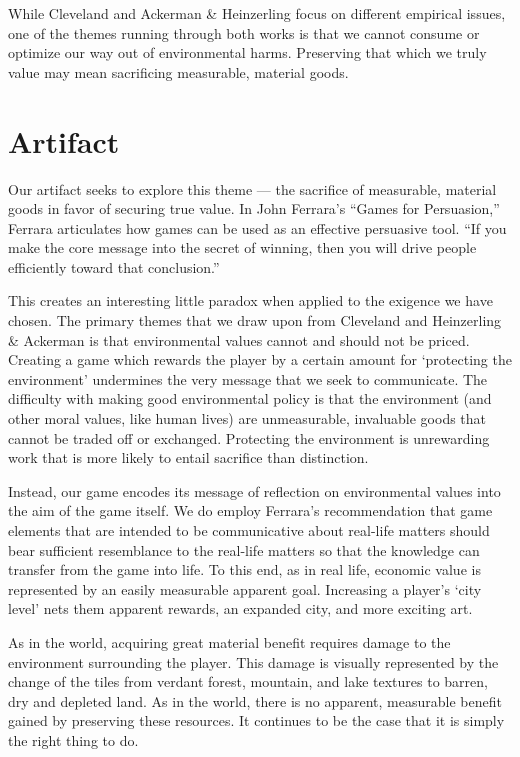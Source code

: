 \documentclass[12pt]{article}
\begin{document}
		While Cleveland and Ackerman \& Heinzerling focus on different empirical
		issues, one of the themes running through both works is that we cannot
		consume or optimize our way out of environmental harms. Preserving that
		which we truly value may mean sacrificing measurable, material goods.

	\section{Artifact}

		Our artifact seeks to explore this theme --- the sacrifice of
		measurable, material goods in favor of securing true value.
		In John Ferrara’s “Games for Persuasion,” Ferrara articulates how games
		can be used as an effective persuasive tool. “If you make the core
		message into the secret of winning, then you will drive people
		efficiently toward that conclusion.”\autocite[299]{ferrara}

		This creates an interesting little paradox when applied to the exigence
		we have chosen. The primary themes that we draw upon from Cleveland and
		Heinzerling \& Ackerman is that environmental values cannot and should
		not be priced. Creating a game which rewards the player by a certain
		amount for ‘protecting the environment’ undermines the very message
		that we seek to communicate. The difficulty with making good
		environmental policy is that the environment (and other moral values,
		like human lives) are unmeasurable, invaluable goods that cannot be
		traded off or exchanged. Protecting the environment is unrewarding work
		that is more likely to entail sacrifice than distinction.

		Instead, our game encodes its message of reflection on environmental
		values into the aim of the game itself. We do employ Ferrara’s
		recommendation that game elements that are intended to be communicative
		about real-life matters should bear sufficient resemblance to the
		real-life matters so that the knowledge can transfer from the game into
		life. To this end, as in real life, economic value is represented by
		an easily measurable apparent goal. Increasing a player’s ‘city level’
		nets them apparent rewards, an expanded city, and more exciting art.

		As in the world, acquiring great material benefit requires
		damage to the environment surrounding the player. This damage is
		visually represented by the change of the tiles from verdant forest,
		mountain, and lake textures to barren, dry and depleted land. As in the
		world, there is no apparent, measurable benefit gained by preserving
		these resources.  It continues to be the case that it is
		simply the right thing to do.
\end{document}
